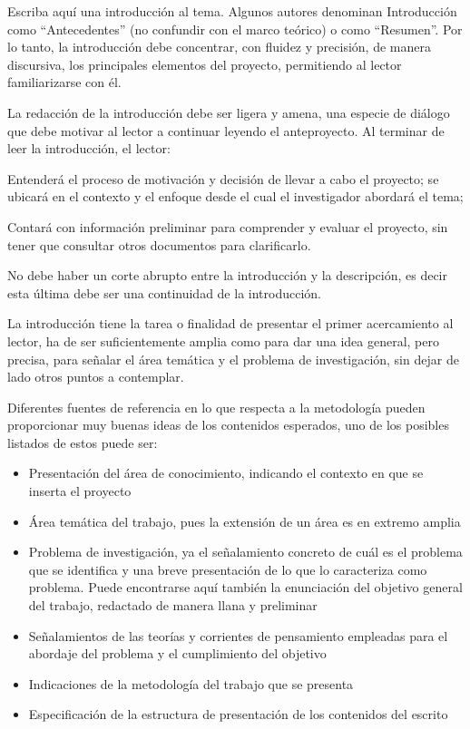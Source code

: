 
\justifying
Escriba aquí una introducción al tema.
Algunos autores denominan Introducción como “Antecedentes” (no confundir con el
marco teórico) o como “Resumen”. Por lo tanto, la introducción debe concentrar, con fluidez y precisión, de manera discursiva, los principales elementos del proyecto, permitiendo al lector familiarizarse con él.

La redacción de la introducción debe ser ligera y amena, una especie de diálogo que debe motivar al lector a continuar leyendo el anteproyecto. Al terminar de leer la introducción, el lector:

Entenderá el proceso de motivación y decisión de llevar a cabo el proyecto; se ubicará en el contexto y el enfoque desde el cual el investigador abordará el tema;

Contará con información preliminar para comprender y evaluar el proyecto, sin tener que consultar otros documentos para clarificarlo.

No debe haber un corte abrupto entre la introducción y la descripción, es decir esta última debe ser una continuidad de la introducción.

La introducción tiene la tarea o finalidad de presentar el primer acercamiento al lector, ha de ser suficientemente amplia como para dar una idea general, pero precisa, para señalar el área temática y el problema de investigación, sin dejar de lado otros puntos a contemplar.

Diferentes fuentes de referencia en lo que respecta a la metodología pueden proporcionar muy buenas ideas de los contenidos esperados, uno de los posibles listados de estos puede ser:

\begin{itemize}
    \item Presentación del área de conocimiento, indicando el contexto en que se inserta el proyecto
    \item Área temática del trabajo, pues la extensión de un área es en extremo amplia
    \item Problema de investigación, ya el señalamiento concreto de cuál es el problema que se identifica y una breve presentación de lo que lo caracteriza como problema. Puede encontrarse aquí también la enunciación del objetivo general del trabajo, redactado de manera llana y preliminar
    \item Señalamientos de las teorías y corrientes de pensamiento empleadas para el abordaje del problema y el cumplimiento del objetivo
    \item Indicaciones de la metodología del trabajo que se presenta
    \item Especificación de la estructura de presentación de los contenidos del escrito 
\end{itemize}

